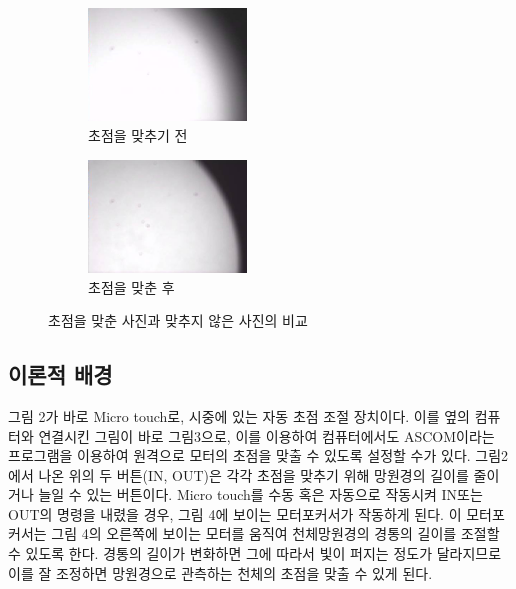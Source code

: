 \documentclass{abstract_hutech}
\begin{document}
\begin{figure}[h]
\begin{subfigure}{0.23\textwidth}
\centering
\includegraphics[width=1\linewidth, height=3cm]{before}
\caption{초점을 맞추기 전}
\label{fig:before}
\end{subfigure}
\begin{subfigure}{0.23\textwidth}
\centering
\includegraphics[width=1\linewidth, height=3cm]{after}
\caption{초점을 맞춘 후}
\label{fig:after}
\end{subfigure}
\caption{초점을 맞춘 사진과 맞추지 않은 사진의 비교}
\end{figure}

\subsection{이론적 배경}

그림 2가 바로 Micro touch로, 시중에 있는 자동 초점 조절 장치이다. 이를 옆의 컴퓨터와 연결시킨 그림이 바로 그림3으로, 이를 이용하여 컴퓨터에서도 ASCOM이라는 프로그램을 이용하여 원격으로 모터의 초점을 맞출 수 있도록 설정할 수가 있다. 그림2에서 나온 위의 두 버튼(IN, OUT)은 각각 초점을 맞추기 위해 망원경의 길이를 줄이거나 늘일 수 있는 버튼이다. Micro touch를 수동 혹은 자동으로 작동시켜 IN또는 OUT의 명령을 내렸을 경우, 그림 4에 보이는 모터포커서가 작동하게 된다. 이 모터포커서는 그림 4의 오른쪽에 보이는 모터를 움직여 천체망원경의 경통의 길이를 조절할 수 있도록 한다. 경통의 길이가 변화하면 그에 따라서 빛이 퍼지는 정도가 달라지므로 이를 잘 조정하면 망원경으로 관측하는 천체의 초점을 맞출 수 있게 된다.
\end{document}
